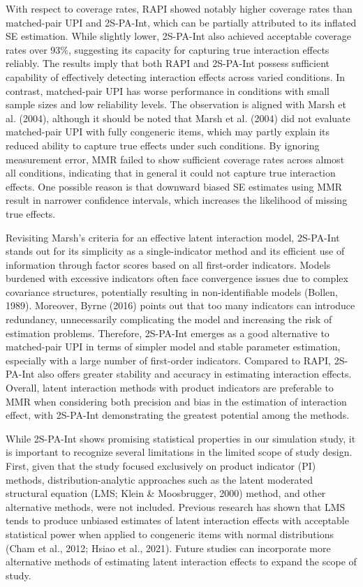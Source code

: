 \documentclass[
  man]{apa6}
\begin{document}
With respect to coverage rates, RAPI showed notably higher coverage rates than matched-pair UPI and 2S-PA-Int, which can be partially attributed to its inflated SE estimation. While slightly lower, 2S-PA-Int also achieved acceptable coverage rates over 93\%, suggesting its capacity for capturing true interaction effects reliably. The results imply that both RAPI and 2S-PA-Int possess sufficient capability of effectively detecting interaction effects across varied conditions. In contrast, matched-pair UPI has worse performance in conditions with small sample sizes and low reliability levels. The observation is aligned with Marsh et al. (2004), although it should be noted that Marsh et al. (2004) did not evaluate matched-pair UPI with fully congeneric items, which may partly explain its reduced ability to capture true effects under such conditions. By ignoring measurement error, MMR failed to show sufficient coverage rates across almost all conditions, indicating that in general it could not capture true interaction effects. One possible reason is that downward biased SE estimates using MMR result in narrower confidence intervals, which increases the likelihood of missing true effects.

Revisiting Marsh's criteria for an effective latent interaction model, 2S-PA-Int stands out for its simplicity as a single-indicator method and its efficient use of information through factor scores based on all first-order indicators. Models burdened with excessive indicators often face convergence issues due to complex covariance structures, potentially resulting in non-identifiable models (Bollen, 1989). Moreover, Byrne (2016) points out that too many indicators can introduce redundancy, unnecessarily complicating the model and increasing the risk of estimation problems. Therefore, 2S-PA-Int emerges as a good alternative to matched-pair UPI in terms of simpler model and stable parameter estimation, especially with a large number of first-order indicators. Compared to RAPI, 2S-PA-Int also offers greater stability and accuracy in estimating interaction effects. Overall, latent interaction methods with product indicators are preferable to MMR when considering both precision and bias in the estimation of interaction effect, with 2S-PA-Int demonstrating the greatest potential among the methods.

While 2S-PA-Int shows promising statistical properties in our simulation study, it is important to recognize several limitations in the limited scope of study design. First, given that the study focused exclusively on product indicator (PI) methods, distribution-analytic approaches such as the latent moderated structural equation (LMS; Klein \& Moosbrugger, 2000) method, and other alternative methods, were not included. Previous research has shown that LMS tends to produce unbiased estimates of latent interaction effects with acceptable statistical power when applied to congeneric items with normal distributions (Cham et al., 2012; Hsiao et al., 2021). Future studies can incorporate more alternative methods of estimating latent interaction effects to expand the scope of study.
\end{document}
